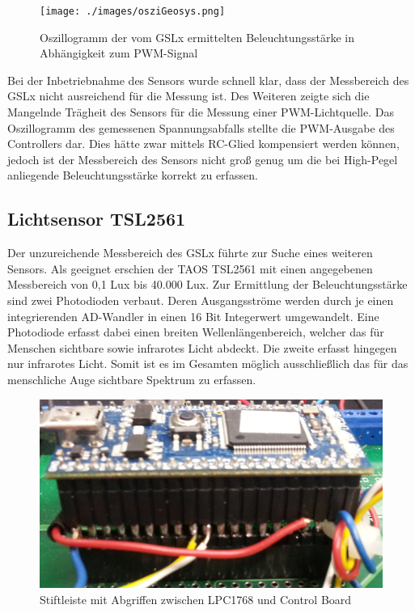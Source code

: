 \documentclass[a4paper,12pt]{scrartcl}
\begin{document}
\begin{figure}[htb]
\begin{center}
\texttt{[image: ./images/osziGeosys.png]}
\end{center}
\caption[Oszillogramm der vom GSLx ermittelten Beleuchtungsstärke in Abhängigkeit zum PWM-Signal, Quelle: Autoren]{\label{fig:gslOszi}Oszillogramm der vom GSLx ermittelten Beleuchtungsstärke in Abhängigkeit zum PWM-Signal}
\end{figure}

Bei der Inbetriebnahme des Sensors wurde schnell klar, dass der Messbereich des GSLx nicht ausreichend für die Messung ist. Des Weiteren zeigte sich die Mangelnde Trägheit des Sensors für die Messung einer PWM-Lichtquelle. Das Oszillogramm des gemessenen Spannungsabfalls stellte die PWM-Ausgabe des Controllers dar. Dies hätte zwar mittels RC-Glied kompensiert werden können, jedoch ist der Messbereich des Sensors nicht groß genug um die bei High-Pegel anliegende Beleuchtungsstärke korrekt zu erfassen.

\subsection{Lichtsensor TSL2561}

Der unzureichende Messbereich des GSLx führte zur Suche eines weiteren Sensors. Als geeignet erschien der TAOS TSL2561 mit einen angegebenen Messbereich von 0,1 Lux bis 40.000 Lux. Zur Ermittlung der Beleuchtungsstärke sind zwei Photodioden verbaut. Deren Ausgangsströme werden durch je einen integrierenden AD-Wandler in einen 16 Bit Integerwert umgewandelt. Eine Photodiode erfasst dabei einen breiten Wellenlängenbereich, welcher das für Menschen sichtbare sowie infrarotes Licht abdeckt. Die zweite erfasst hingegen nur infrarotes Licht. Somit ist es im Gesamten möglich ausschließlich das für das menschliche Auge sichtbare Spektrum zu erfassen.

\begin{figure}[htb]
\begin{center}
\includegraphics[width=0.5\hsize]{./images/stiftleiste.png}
\end{center}
\caption{\label{fig:stiftleiste}Stiftleiste mit Abgriffen zwischen LPC1768 und Control Board}
\end{figure}
\end{document}
